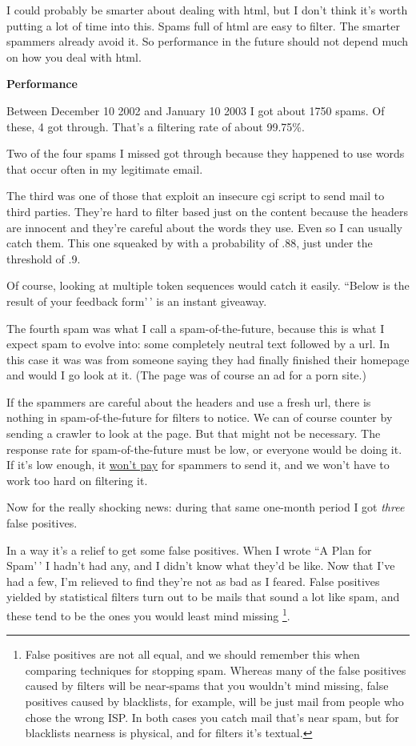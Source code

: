 I could probably be smarter about dealing with html, but I don't think
it's worth putting a lot of time into this. Spams full of html are easy
to filter. The smarter spammers already avoid it. So performance in the
future should not depend much on how you deal with html.

\textbf{Performance}

Between December 10 2002 and January 10 2003 I got about 1750 spams. Of
these, 4 got through. That's a filtering rate of about 99.75\%.

Two of the four spams I missed got through because they happened to use
words that occur often in my legitimate email.

The third was one of those that exploit an insecure cgi script to send
mail to third parties. They're hard to filter based just on the content
because the headers are innocent and they're careful about the words
they use. Even so I can usually catch them. This one squeaked by with a
probability of .88, just under the threshold of .9.

Of course, looking at multiple token sequences would catch it easily.
``Below is the result of your feedback form'\,' is an instant giveaway.

The fourth spam was what I call a spam-of-the-future, because this is
what I expect spam to evolve into: some completely neutral text followed
by a url. In this case it was was from someone saying they had finally
finished their homepage and would I go look at it. (The page was of
course an ad for a porn site.)

If the spammers are careful about the headers and use a fresh url, there
is nothing in spam-of-the-future for filters to notice. We can of course
counter by sending a crawler to look at the page. But that might not be
necessary. The response rate for spam-of-the-future must be low, or
everyone would be doing it. If it's low enough, it
\href{wfks.html}{won't pay} for spammers to send it, and we won't have
to work too hard on filtering it.

Now for the really shocking news: during that same one-month period I
got \emph{three} false positives.

In a way it's a relief to get some false positives. When I wrote ``A
Plan for Spam'\,' I hadn't had any, and I didn't know what they'd be
like. Now that I've had a few, I'm relieved to find they're not as bad
as I feared. False positives yielded by statistical filters turn out to
be mails that sound a lot like spam, and these tend to be the ones you
would least mind missing \footnote{False positives are not all equal, and we should remember this
when comparing techniques for stopping spam. Whereas many of the false
positives caused by filters will be near-spams that you wouldn't mind
missing, false positives caused by blacklists, for example, will be just
mail from people who chose the wrong ISP. In both cases you catch mail
that's near spam, but for blacklists nearness is physical, and for
filters it's textual.}.


